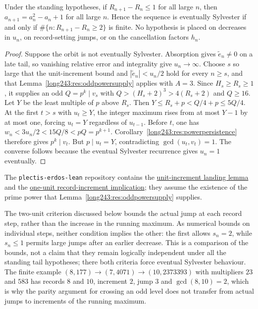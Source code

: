 \begin{theorem}\label{long243:res:unitrecord}
Under the standing hypotheses, if $R_{n+1}-R_n\le1$ for all large $n$, then $a_{n+1}=a_n^2-a_n+1$
for all large $n$.  Hence the sequence is eventually Sylvester if and only if
$\#\{n:R_{n+1}-R_n\ge2\}$ is finite.  No hypothesis is placed on decreases in $u_n$, on
record-setting jumps, or on the cancellation factors $h_n$.
\end{theorem}

\begin{proof}
Suppose the orbit is not eventually Sylvester. Absorption gives
$\tilde e_n\ne0$ on a late tail, so vanishing relative error and integrality give
$u_n\to\infty$. Choose $s$ so large that the unit-increment bound and
$|\tilde e_n|<u_n/2$ hold for every $n\ge s$, and that
Lemma~\ref{long243:res:oddpowersupply} applies with $A=3$.
Since $H_s\ge R_s\ge1$, it supplies an odd $Q=p^k\mid v_s$ with
$Q>(H_s+2)^3>4(R_s+2)$ and $Q\ge16$.
Let $Y$ be the least multiple of $p$ above $R_s$. Then
$Y\le R_s+p< Q/4+p\le5Q/4$.
At the first $t>s$ with $u_t\ge Y$, the integer maximum rises from
at most $Y-1$ by at most one, forcing $u_t=Y$ regardless of
$u_{t-1}$. Before $t$, one has
$w_n<3u_n/2<15Q/8<pQ=p^{k+1}$.
Corollary~\ref{long243:res:powerpersistence} therefore gives $p^k\mid v_t$.
But $p\mid u_t=Y$, contradicting $\gcd(u_t,v_t)=1$.
The converse follows because the eventual Sylvester recurrence gives $u_n=1$ eventually.
\end{proof}

The \texttt{plectis-erdos-lean} repository contains the
\href{https://github.com/wcook04/plectis-erdos-lean/blob/52f29ad173b04e3bac941b3663f2b9aebe5de0bb/ErdosProblems/Erdos243/RecordIncrementBarrier.lean\#L329}{unit-increment landing lemma} and the
\href{https://github.com/wcook04/plectis-erdos-lean/blob/52f29ad173b04e3bac941b3663f2b9aebe5de0bb/ErdosProblems/Erdos243/RecordIncrementBarrier.lean\#L425}{one-unit record-increment implication};
they assume the existence of the prime power that
Lemma~\ref{long243:res:oddpowersupply} supplies.


The two-unit criterion discussed below bounds the actual jump at each
record step, rather than the increase in the running maximum. As numerical
bounds on individual steps, neither condition implies the other: the first
allows $s_n=2$, while $s_n\le1$ permits large jumps after an earlier
decrease. This is a comparison of the bounds, not a claim that they remain
logically independent under all the standing tail hypotheses; there both
criteria force eventual Sylvester behaviour.
The finite example
$(8,177)\to(7,4071)\to(10,2373393)$ with multipliers $23$ and $583$ has records
$8$ and $10$, increment $2$, jump $3$ and $\gcd(8,10)=2$, which is why the
parity argument for crossing an odd level does not transfer from actual
jumps to increments of the running maximum.

